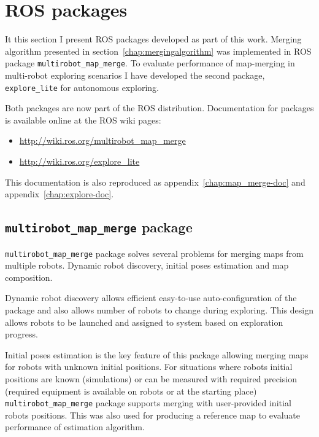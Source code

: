 \chapter{ROS packages}
\label{chap:ros-packages}

It this section I present \gls{ROS} packages developed as part of this work. Merging algorithm presented in section~\ref{chap:mergingalgorithm} was implemented in \gls{ROS} package \texttt{multirobot\_map\_merge}. To evaluate performance of map-merging in multi-robot exploring scenarios I have developed the second package, \texttt{explore\_lite} for autonomous exploring.

Both packages are now part of the \gls{ROS} distribution. Documentation for packages is available online at the \gls{ROS} wiki pages:

\begin{itemize}
	\item \url{http://wiki.ros.org/multirobot_map_merge}
	\item \url{http://wiki.ros.org/explore_lite}
\end{itemize}

This documentation is also reproduced as appendix~\ref{chap:map_merge-doc} and appendix~\ref{chap:explore-doc}.

\section{\texttt{multirobot\_map\_merge} package} %
\label{sec:map_merge-package}

\texttt{multirobot\_map\_merge} package solves several problems for merging maps from multiple robots. Dynamic robot discovery, initial poses estimation and map composition.

Dynamic robot discovery allows efficient easy-to-use auto-configuration of the package and also allows number of robots to change during exploring. This design allows robots to be launched and assigned to system based on exploration progress.

Initial poses estimation is the key feature of this package allowing merging maps for robots with unknown initial positions. For situations where robots initial positions are known (simulations) or can be measured with required precision (required equipment is available on robots or at the starting place) \texttt{multirobot\_map\_merge} package supports merging with user-provided initial robots positions. This was also used for producing a reference map to evaluate performance of estimation algorithm.

